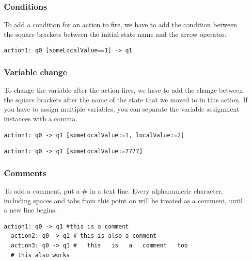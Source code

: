\documentclass[12pt]{article}
\begin{document}
\subsubsection{Conditions}
To add a condition for an action to fire, we have to add the condition between the square brackets between the initial state name and the arrow operator.

\begin{lstlisting}[title={Local action that can only fire if someLocalValue is equal to 1.}]
  action1: q0 [someLocalValue==1] -> q1
\end{lstlisting}

\subsubsection{Variable change}
To change the variable after the action fires, we have to add the change between the square brackets after the name of the state that we moved to in this action. If you have to assign multiple variables, you can separate the variable assignment instances with a comma.
\begin{lstlisting}[title={Action that sets the value of someLocalValue to 1 and localValue to 2.}]
  action1: q0 -> q1 [someLocalValue:=1, localValue:=2]
\end{lstlisting}
\begin{lstlisting}[title={Action that sets the value of someLocalValue to 7777.}]
  action1: q0 -> q1 [someLocalValue:=7777]
\end{lstlisting}

\subsubsection{Comments}
To add a comment, put a $\#$ in a text line. Every alphanumeric character, including spaces and tabs from this point on will be treated as a comment, until a new line begins.
\begin{lstlisting}[title={Example comments in a file.}]
  action1: q0 -> q1 #this is a comment
  action2: q0 -> q1 # this is also a comment
  action3: q0 -> q1 #   this   is   a   comment   too
  # this also works
\end{lstlisting}
\end{document}
